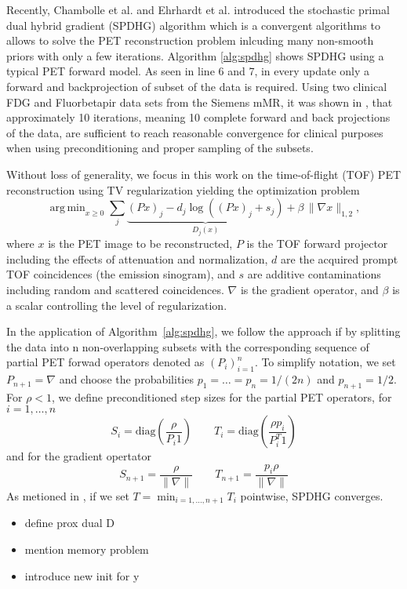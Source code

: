 \documentclass[11pt,twocolumn,twoside]{article}
\DeclareMathOperator*{\argmin}{arg\,min}
\begin{document}
Recently, Chambolle et al. \cite{Chambolle2018} and  Ehrhardt et al. \cite{Ehrhardt2019} introduced 
the stochastic primal dual hybrid gradient (SPDHG) algorithm which is a convergent algorithms
to allows to solve the PET reconstruction problem inlcuding many non-smooth priors with
only a few iterations. 
Algorithm \ref{alg:spdhg} shows SPDHG using a typical PET forward model.
As seen in line 6 and 7, in every update only a forward and backprojection of subset
of the data is required.
Using two clinical FDG and Fluorbetapir data sets from the Siemens mMR, 
it was shown in \cite{Ehrhardt2019}, that approximately 10 iterations, meaning 10 complete 
forward and back projections of the data, are sufficient to reach reasonable convergence
for clinical purposes when using preconditioning and proper sampling of the subsets.

Without loss of generality, we focus in this work on the time-of-flight (TOF) PET reconstruction 
using TV regularization yielding the optimization problem
%
\begin{equation}
\argmin _{x\geq 0} \sum_j \underbrace{(Px)_j -  d_j \log \left( (Px)_ j + s_j \right)}_{D_j(x)} + \beta \, \|\nabla x\|_{1,2},
\end{equation}
where $x$ is the PET image to be reconstructed, $P$ is the TOF forward projector including the effects
of attenuation and normalization, $d$ are the acquired prompt TOF coincidences (the emission sinogram),
and $s$ are additive contaminations including random and scattered coincidences. $\nabla$ is the gradient
operator, and $\beta$ is a scalar controlling the level of regularization.

In the application of Algorithm~\ref{alg:spdhg}, we follow the approach if \cite{Ehrhardt2019}
by splitting the data into n non-overlapping subsets with the corresponding 
sequence of partial PET forwad operators denoted as $(P_i)_{i=1}^n$.
To simplify notation, we set $P_{n+1} = \nabla$ and choose the probabilities $p_1=\ldots=p_n = 1/(2n)$
and $p_{n+1} = 1/2$.
For $\rho<1$, we define preconditioned step sizes for the partial PET operators, for $i=1,\ldots,n$
\[ S_i = \text{diag}(\frac{\rho}{P_i 1} )\qquad  T_i = \text{diag}(\frac{\rho p_i}{P^T_i 1}) \]
and for the gradient opertator
\[ S_{n+1} = \frac{\rho}{\|\nabla\|} \qquad T_{n+1} = \frac{p_i\rho}{\|\nabla\|} \]  
As metioned in \cite{Ehrhardt2019}, if we set $T = \min_{i=1,\ldots,n+1} T_i$ pointwise,
SPDHG converges.

\begin{itemize}
\item define prox dual D
\item mention memory problem
\item introduce new init for y
\end{itemize}
\end{document}
